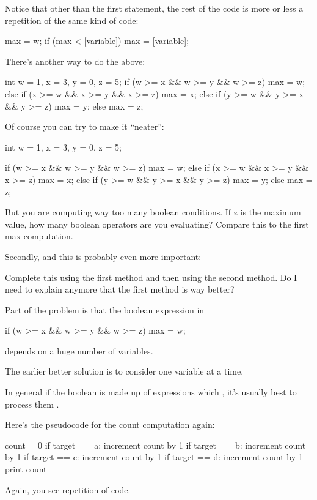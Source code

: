 Notice that other than the first statement, the rest of the code is more
or less a repetition of the same kind of code:
\begin{console}
max = w;
if (max < [variable])
   max = [variable]; 
\end{console}

There's another  way to do the above:
\begin{consolethree}
int w = 1, x = 3, y = 0, z = 5;
if (w >= x && w >= y && w >= z)
    max = w;
else
{
     if (x >= w && x >= y && x >= z)
         max = x;
     else
     {
        if (y >= w && y >= x && y >= z)
            max = y;
        else
            max = z;
      }
}
\end{consolethree}

Of course you can try to make it ``neater'':
\begin{console}
int w = 1, x = 3, y = 0, z = 5;

if (w >= x && w >= y && w >= z)
    max = w;
else if (x >= w && x >= y && x >= z)
    max = x;
else if (y >= w && y >= x && y >= z)
    max = y;
else
    max = z;
\end{console}

But you are computing way too many boolean conditions. If z is the
maximum value, how many boolean operators are you evaluating? Compare
this to the first max computation.

Secondly, and this is probably even more important:

Complete this using the first method and then using the second method.
Do I need to explain anymore that the first method is way better?

Part of the problem is that the boolean expression in
\begin{console}
if (w >= x && w >= y && w >= z)
    max = w;  
\end{console}
depends on a huge number of variables.

The earlier better solution is to consider one variable at a time.

In general if the boolean is made up of expressions which , it's usually best to process them .

\newpage{}

Here's the pseudocode for the count computation again:
\begin{console}
count = 0
if target == a:
   increment count by 1
if target == b:
   increment count by 1
if target == c:
   increment count by 1
if target == d:
   increment count by 1
print count 
\end{console}
Again, you see repetition of code.

